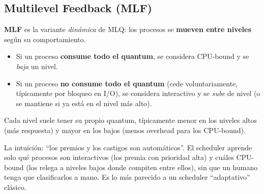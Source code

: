 \documentclass[11pt,a4paper]{article}
\begin{document}
\begin{center}
\end{center}

\subsection{Multilevel Feedback (MLF)}

\begin{definicion}
\textbf{MLF} es la variante \emph{dinámica} de MLQ: los procesos se
\textbf{mueven entre niveles} según su comportamiento.
\begin{itemize}[leftmargin=*,nosep]
    \item Si un proceso \textbf{consume todo el quantum}, se considera
        CPU-bound y se \emph{baja} un nivel.
    \item Si un proceso \textbf{no consume todo el quantum} (cede
        voluntariamente, típicamente por bloqueo en I/O), se considera
        interactivo y se \emph{sube} de nivel (o se mantiene si ya
        está en el nivel más alto).
\end{itemize}
Cada nivel suele tener su propio quantum, típicamente menor en los
niveles altos (más respuesta) y mayor en los bajos (menos overhead
para los CPU-bound).
\end{definicion}

\begin{idea}
La intuición: ``los premios y los castigos son automáticos''. El
scheduler aprende solo qué procesos son interactivos (los premia con
prioridad alta) y cuáles CPU-bound (los relega a niveles bajos
donde compiten entre ellos), sin que un humano tenga que clasificarlos
a mano. Es lo más parecido a un scheduler ``adaptativo'' clásico.
\end{idea}
\end{document}
